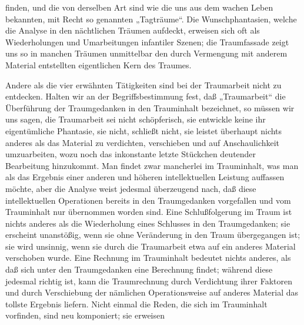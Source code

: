 \documentclass[twoside=true,titlepage=false,open=any, parskip=never, fontsize=10pt, headings=small, chapterprefix=false, appendixprefix=false]{scrbook}
\begin{document}
         
            
            
            
        \pstart
        finden, und die von derselben Art sind wie die uns aus dem wachen
               Leben bekannten, mit Recht so genannten „Tagträume“. Die Wunschphantasien,
               welche die Analyse in den nächtlichen Träumen aufdeckt, erweisen sich oft als
               Wiederholungen und Umarbeitungen infantiler Szenen; die Traumfassade zeigt uns
               so in manchen Träumen unmittelbar den durch Vermengung mit anderem Material
               entstellten eigentlichen Kern des Traumes.
        \pend
    
            
        \pstart
        Andere als die vier erwähnten Tätigkeiten sind bei der Traumarbeit
               nicht zu entdecken. Halten wir an der Begriffsbestimmung fest, daß „Traumarbeit“
               die Überführung der Traumgedanken in den Trauminhalt bezeichnet, so müssen wir
               uns sagen, die Traumarbeit sei nicht schöpferisch, sie entwickle
               keine ihr eigentümliche Phantasie, sie  nicht, schließt nicht, sie leistet überhaupt nichts anderes als das
               Material zu verdichten, verschieben und auf Anschaulichkeit umzuarbeiten, wozu
               noch das inkonstante letzte Stückchen deutender Bearbeitung hinzukommt. Man
               findet zwar mancherlei im Trauminhalt, was man als das Ergebnis einer
               anderen und höheren intellektuellen Leistung auffassen möchte, aber die Analyse
               weist jedesmal überzeugend nach, daß
               diese intellektuellen Operationen bereits in den
                  Traumgedanken vorgefallen und vom Trauminhalt nur übernommen worden sind.
               Eine Schlußfolgerung im Traum ist nichts anderes als die Wiederholung eines
               Schlusses in den Traumgedanken; sie erscheint unanstößig, wenn sie ohne
               Veränderung in den Traum übergegangen ist; sie wird unsinnig, wenn sie durch die
               Traumarbeit etwa auf ein anderes Material verschoben wurde. Eine Rechnung im
               Trauminhalt bedeutet nichts anderes, als daß sich unter den Traumgedanken eine
               Berechnung findet; während diese jedesmal richtig ist, kann die Traumrechnung durch Verdichtung ihrer Faktoren und durch Verschiebung der nämlichen Operationsweise auf anderes Material das tollste
               Ergebnis liefern. Nicht einmal die Reden, die sich im Trauminhalt vorfinden,
               sind neu komponiert; sie erweisen
        \pend
    
\end{document}
